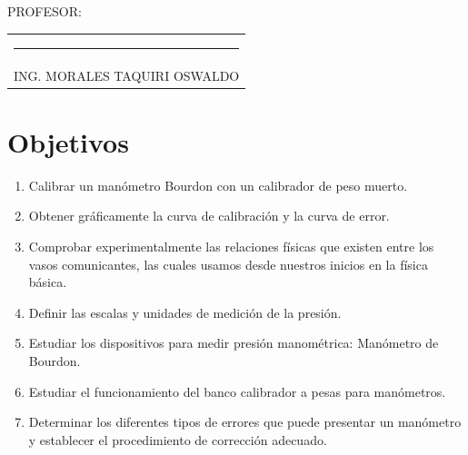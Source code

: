\documentclass[a4paper,12pt]{report}
\begin{document}
{\large PROFESOR:} \\[0.6cm]
\begin{center}
\begin{tabular}{c}
\rule[3pt]{4.8in}{1pt}\\[1pt]
ING. MORALES TAQUIRI OSWALDO
\end{tabular}
\end{center}
\vfill
\newpage
\tableofcontents
\newpage
{} %
\setcounter{page}{1}  %
\chapter{Objetivos}
\begin{enumerate}
\item Calibrar un manómetro Bourdon con un calibrador de peso muerto.
\item Obtener gráficamente la curva de calibración y la curva de error.
\item Comprobar experimentalmente las relaciones físicas que existen entre los vasos comunicantes, las cuales usamos desde nuestros inicios en la física básica. 
\item Definir las escalas y unidades de medición de la presión.
\item Estudiar los dispositivos para medir presión manométrica: Manómetro de Bourdon.
\item Estudiar el funcionamiento del banco calibrador a pesas para manómetros.
\item Determinar los diferentes tipos de errores que puede presentar un manómetro y establecer el procedimiento de corrección adecuado.
\end{enumerate}
\end{document}
